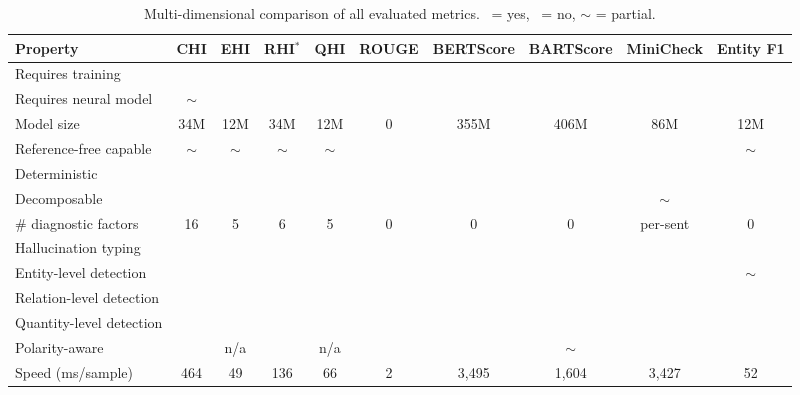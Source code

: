 \documentclass[11pt]{article}
\newcommand{\cmark}{\ding{51}}
\newcommand{\xmark}{\ding{55}}
\begin{document}
\begin{table}[h]
\centering
\caption{Multi-dimensional comparison of all evaluated metrics. \cmark\ = yes, \xmark\ = no, $\sim$ = partial.}
\label{tab:comparison}
\small
\begin{tabular}{l|cccc|ccc|cc}
\toprule
\textbf{Property} & \textbf{CHI} & \textbf{EHI} & \textbf{RHI$^*$} & \textbf{QHI} & \textbf{ROUGE} & \textbf{BERTScore} & \textbf{BARTScore} & \textbf{MiniCheck} & \textbf{Entity F1} \\
\midrule
Requires training & \xmark & \xmark & \xmark & \xmark & \xmark & \xmark & \xmark & \xmark & \xmark \\
Requires neural model & $\sim$ & \xmark & \cmark & \xmark & \xmark & \cmark & \cmark & \cmark & \xmark \\
Model size & 34M & 12M & 34M & 12M & 0 & 355M & 406M & 86M & 12M \\
Reference-free capable & $\sim$ & $\sim$ & $\sim$ & $\sim$ & \xmark & \xmark & \cmark & \cmark & $\sim$ \\
Deterministic & \cmark & \cmark & \cmark & \cmark & \cmark & \cmark & \cmark & \cmark & \cmark \\
\midrule
Decomposable & \cmark & \cmark & \cmark & \cmark & \xmark & \xmark & \xmark & $\sim$ & \xmark \\
\# diagnostic factors & 16 & 5 & 6 & 5 & 0 & 0 & 0 & per-sent & 0 \\
Hallucination typing & \cmark & \cmark & \cmark & \cmark & \xmark & \xmark & \xmark & \xmark & \xmark \\
Entity-level detection & \cmark & \cmark & \xmark & \xmark & \xmark & \xmark & \xmark & \xmark & $\sim$ \\
Relation-level detection & \cmark & \xmark & \cmark & \xmark & \xmark & \xmark & \xmark & \xmark & \xmark \\
Quantity-level detection & \cmark & \xmark & \xmark & \cmark & \xmark & \xmark & \xmark & \xmark & \xmark \\
Polarity-aware & \xmark & n/a & \xmark & n/a & \xmark & \xmark & $\sim$ & \cmark & \xmark \\
\midrule
Speed (ms/sample) & 464 & 49 & 136 & 66 & 2 & 3,495 & 1,604 & 3,427 & 52 \\
\bottomrule
\end{tabular}
\end{table}
\end{document}
